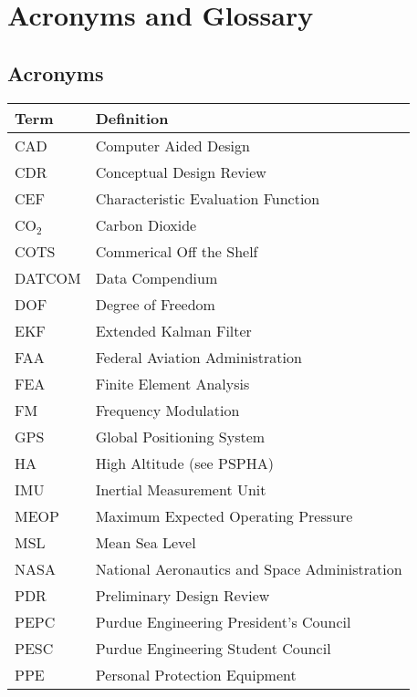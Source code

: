 \section{Acronyms and Glossary}
\subsection*{Acronyms}

\begin{table}[htbp]\small
    \centering
    \begin{tabular}{|p{5cm}|p{10cm}|}
        \hline
        \textbf{Term} & \textbf{Definition} \\ \hline
        CAD & Computer Aided Design \\ \hline
        CDR & Conceptual Design Review \\ \hline
        CEF & Characteristic Evaluation Function \\ \hline
        CO\(_2\) & Carbon Dioxide \\ \hline
        COTS & Commerical Off the Shelf \\ \hline
        DATCOM & Data Compendium \\ \hline
        DOF & Degree of Freedom \\ \hline
        EKF & Extended Kalman Filter \\ \hline
        FAA & Federal Aviation Administration \\ \hline
        FEA & Finite Element Analysis \\ \hline
        FM & Frequency Modulation \\ \hline
        GPS & Global Positioning System \\ \hline
        HA & High Altitude (see PSPHA) \\ \hline
        IMU & Inertial Measurement Unit \\ \hline
        MEOP & Maximum Expected Operating Pressure \\ \hline
        MSL & Mean Sea Level \\ \hline
        NASA & National Aeronautics and Space Administration \\ \hline
        PDR & Preliminary Design Review \\ \hline
        PEPC & Purdue Engineering President's Council \\ \hline
        PESC & Purdue Engineering Student Council \\ \hline
        PPE & Personal Protection Equipment \\ \hline

\end{tabular}
\end{table}
